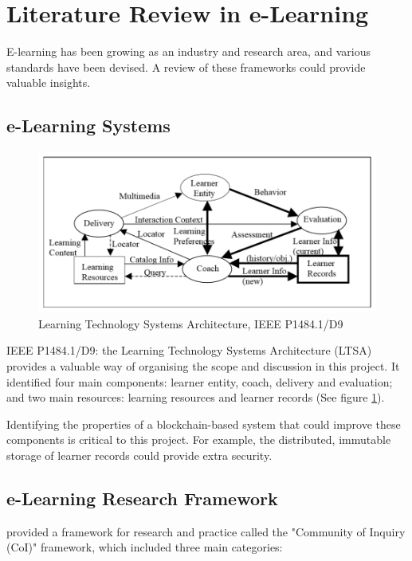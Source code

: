 \section{Literature Review in e-Learning}

E-learning has been growing as an industry and research area, and various standards have been devised. 
A review of these frameworks could provide valuable insights.

\subsection{e-Learning Systems}

\begin{figure}[!ht] 
    \centering    
    \includegraphics[width=1.0\textwidth]{LTSA}
    \caption[Learning Technology Systems Architecture]
        {Learning Technology Systems Architecture, IEEE P1484.1/D9 \citep{farance1999learning}}
    \label{fig:LTSA}
\end{figure}

IEEE P1484.1/D9: the Learning Technology Systems Architecture (LTSA) provides a valuable way of organising 
the scope and discussion in this project. It identified four main components: learner entity, coach, 
delivery and evaluation; and two main resources: learning resources and learner records (See figure \ref{fig:LTSA}).

Identifying the properties of a blockchain-based system that could improve these components is 
critical to this project. For example, the distributed, immutable storage of learner records could 
provide extra security.

\subsection{e-Learning Research Framework}

\citet{garrison2011learning} provided a framework for research and practice called the "Community 
of Inquiry (CoI)" framework, which included three main categories:

